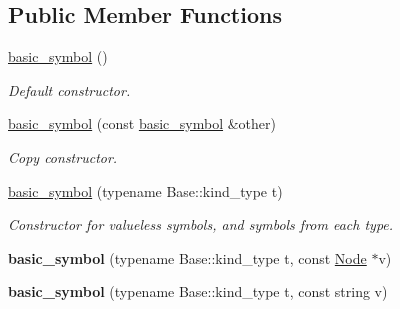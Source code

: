 \subsection*{Public Member Functions}
\begin{DoxyCompactItemize}
\item 
\hypertarget{structyy_1_1parser_1_1basic__symbol_a4c089d17ee545d109ca5660fbaa05b95}{}\hyperlink{structyy_1_1parser_1_1basic__symbol_a4c089d17ee545d109ca5660fbaa05b95}{basic\+\_\+symbol} ()\label{structyy_1_1parser_1_1basic__symbol_a4c089d17ee545d109ca5660fbaa05b95}

\begin{DoxyCompactList}\small\item\em Default constructor. \end{DoxyCompactList}\item 
\hypertarget{structyy_1_1parser_1_1basic__symbol_a840c58a9a75349d49586d6d0701dc0d9}{}\hyperlink{structyy_1_1parser_1_1basic__symbol_a840c58a9a75349d49586d6d0701dc0d9}{basic\+\_\+symbol} (const \hyperlink{structyy_1_1parser_1_1basic__symbol}{basic\+\_\+symbol} \&other)\label{structyy_1_1parser_1_1basic__symbol_a840c58a9a75349d49586d6d0701dc0d9}

\begin{DoxyCompactList}\small\item\em Copy constructor. \end{DoxyCompactList}\item 
\hypertarget{structyy_1_1parser_1_1basic__symbol_a20a558cd967a14b2645423110ed4f773}{}\hyperlink{structyy_1_1parser_1_1basic__symbol_a20a558cd967a14b2645423110ed4f773}{basic\+\_\+symbol} (typename Base\+::kind\+\_\+type t)\label{structyy_1_1parser_1_1basic__symbol_a20a558cd967a14b2645423110ed4f773}

\begin{DoxyCompactList}\small\item\em Constructor for valueless symbols, and symbols from each type. \end{DoxyCompactList}\item 
\hypertarget{structyy_1_1parser_1_1basic__symbol_a8a952ff44a513f5237fd81d038c0e0c2}{}{\bfseries basic\+\_\+symbol} (typename Base\+::kind\+\_\+type t, const \hyperlink{classNode}{Node} $\ast$v)\label{structyy_1_1parser_1_1basic__symbol_a8a952ff44a513f5237fd81d038c0e0c2}

\item 
\hypertarget{structyy_1_1parser_1_1basic__symbol_ade2aabbeb295bdadd1862239e8a7cda1}{}{\bfseries basic\+\_\+symbol} (typename Base\+::kind\+\_\+type t, const string v)\label{structyy_1_1parser_1_1basic__symbol_ade2aabbeb295bdadd1862239e8a7cda1}


\end{DoxyCompactItemize}
